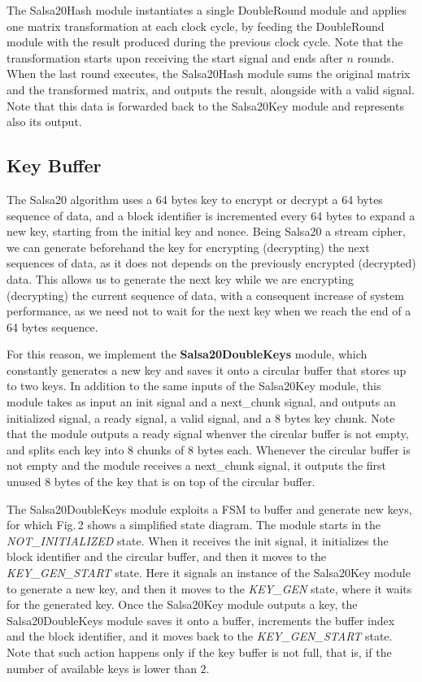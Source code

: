 \documentclass[letterpaper, 10pt, oneside]{article}
\begin{document}
The Salsa20Hash module instantiates a single DoubleRound module and applies one matrix transformation at each clock cycle, by feeding the DoubleRound module with the result produced during the previous clock cycle.
Note that the transformation starts upon receiving the start signal and ends after $n$ rounds.
When the last round executes, the Salsa20Hash module sums the original matrix and the transformed matrix, and outputs the result, alongside with a valid signal.
Note that this data is forwarded back to the Salsa20Key module and represents also its output.

\subsection{Key Buffer}
The Salsa20 algorithm uses a 64 bytes key to encrypt or decrypt a 64 bytes sequence of data, and a block identifier is incremented every 64 bytes to expand a new key, starting from the initial key and nonce.
Being Salsa20 a stream cipher, we can generate beforehand the key for encrypting (decrypting) the next sequences of data, as it does not depends on the previously encrypted (decrypted) data.
This allows us to generate the next key while we are encrypting (decrypting) the current sequence of data, with a consequent increase of system performance, as we need not to wait for the next key when we reach the end of a 64 bytes sequence.

For this reason, we implement the \textbf{Salsa20DoubleKeys} module, which constantly generates a new key and saves it onto a circular buffer that stores up to two keys.
In addition to the same inputs of the Salsa20Key module, this module takes as input an init signal and a next\_chunk signal, and outputs an initialized signal, a ready signal, a valid signal, and a 8 bytes key chunk.
Note that the module outputs a ready signal whenver the circular buffer is not empty, and splits each key into 8 chunks of 8 bytes each.
Whenever the circular buffer is not empty and the module receives a next\_chunk signal, it outputs the first unused 8 bytes of the key that is on top of the circular buffer.

The Salsa20DoubleKeys module exploits a FSM to buffer and generate new keys, for which Fig.\,2 shows a simplified state diagram.
The module starts in the \textit{NOT\_INITIALIZED} state.
When it receives the init signal, it initializes the block identifier and the circular buffer, and then it moves to the \textit{KEY\_GEN\_START} state.
Here it signals an instance of the Salsa20Key module to generate a new key, and then it moves to the \textit{KEY\_GEN} state, where it waits for the generated key.
Once the Salsa20Key module outputs a key, the Salsa20DoubleKeys module saves it onto a buffer, increments the buffer index and the block identifier, and it moves back to the \textit{KEY\_GEN\_START} state.
Note that such action happens only if the key buffer is not full, that is, if the number of available keys is lower than $2$.
\end{document}
